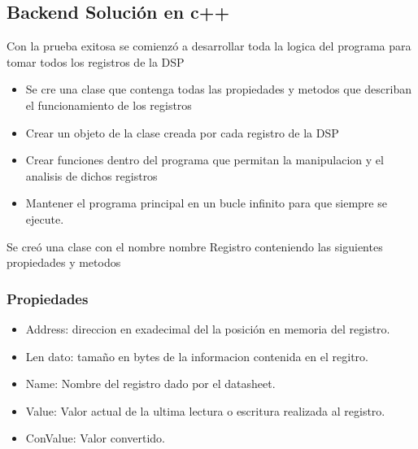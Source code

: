         \subsection{Backend Solución en c++}
            Con la prueba exitosa se comienzó a desarrollar toda la logica del programa para tomar todos los registros de la DSP
            \begin{itemize}
                \item Se cre una clase que contenga todas las propiedades y metodos que describan el funcionamiento de los registros
                \item Crear un objeto de la clase creada por cada registro de la DSP
                \item Crear funciones dentro del programa que permitan la manipulacion y el analisis de dichos registros
                \item Mantener el programa principal en un bucle infinito para que siempre se ejecute.
            \end{itemize}

            Se creó una clase con el nombre nombre Registro conteniendo las siguientes propiedades y metodos
            \subsubsection{Propiedades}
                \begin{itemize}
                    \item Address: direccion en exadecimal del la posición en memoria del registro.
                    \item Len dato: tamaño en bytes de la informacion contenida en el regitro.
                    \item Name: Nombre del registro dado por el datasheet.
                    \item Value: Valor actual de la ultima lectura o escritura realizada al registro.
                    \item ConValue: Valor convertido. 
                \end{itemize}
